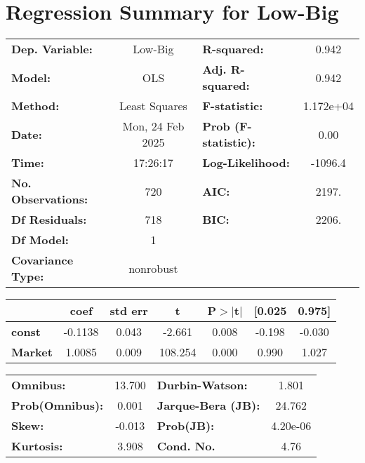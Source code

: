 \documentclass{article}
\begin{document}
\section*{Regression Summary for Low-Big}
\begin{center}
\begin{tabular}{lclc}
\toprule
\textbf{Dep. Variable:}    &     Low-Big      & \textbf{  R-squared:         } &     0.942   \\
\textbf{Model:}            &       OLS        & \textbf{  Adj. R-squared:    } &     0.942   \\
\textbf{Method:}           &  Least Squares   & \textbf{  F-statistic:       } & 1.172e+04   \\
\textbf{Date:}             & Mon, 24 Feb 2025 & \textbf{  Prob (F-statistic):} &     0.00    \\
\textbf{Time:}             &     17:26:17     & \textbf{  Log-Likelihood:    } &   -1096.4   \\
\textbf{No. Observations:} &         720      & \textbf{  AIC:               } &     2197.   \\
\textbf{Df Residuals:}     &         718      & \textbf{  BIC:               } &     2206.   \\
\textbf{Df Model:}         &           1      & \textbf{                     } &             \\
\textbf{Covariance Type:}  &    nonrobust     & \textbf{                     } &             \\
\bottomrule
\end{tabular}
\begin{tabular}{lcccccc}
                & \textbf{coef} & \textbf{std err} & \textbf{t} & \textbf{P$> |$t$|$} & \textbf{[0.025} & \textbf{0.975]}  \\
\midrule
\textbf{const}  &      -0.1138  &        0.043     &    -2.661  &         0.008        &       -0.198    &       -0.030     \\
\textbf{Market} &       1.0085  &        0.009     &   108.254  &         0.000        &        0.990    &        1.027     \\
\bottomrule
\end{tabular}
\begin{tabular}{lclc}
\textbf{Omnibus:}       & 13.700 & \textbf{  Durbin-Watson:     } &    1.801  \\
\textbf{Prob(Omnibus):} &  0.001 & \textbf{  Jarque-Bera (JB):  } &   24.762  \\
\textbf{Skew:}          & -0.013 & \textbf{  Prob(JB):          } & 4.20e-06  \\
\textbf{Kurtosis:}      &  3.908 & \textbf{  Cond. No.          } &     4.76  \\
\bottomrule
\end{tabular}
\end{center}
\end{document}
